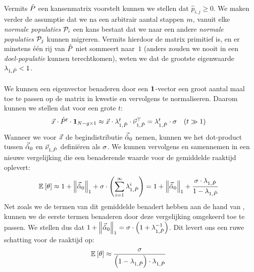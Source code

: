 \paragraph{}
Vermits $\removmat$ een kansenmatrix voorstelt kunnen we stellen dat $\hat{p}_{i,j}\geq 0$. We maken verder de assumptie dat we na een arbitrair aantal stappen $\arbitraryval$, vanuit elke \emph{normale populaties} $\calP_i$ een kans bestaat dat we naar een andere \emph{normale populaties} $\calP_j$ kunnen migreren. Vermits hierdoor de matrix primitief is, en er minstens \'e\'en rij van $\removmat$ niet sommeert naar~$1$ (anders zouden we nooit in een \emph{doel-populatie} kunnen terechtkomen), weten we dat de grootste eigenwaarde $\ev[1,\removmat]<1$.

\paragraph{}
We kunnen een eigenvector benaderen door een $\onematrix$-vector een groot aantal maal toe te passen op de matrix in kwestie en vervolgens te normaliseren. Daarom kunnen we stellen dat voor een grote $t$:
\begin{equation}
\begin{array}{cc}
\arbitraryvec\cdot\removmat^t\cdot\onematrix[\npop-\ntarpop\times1]\approx\arbitraryvec\cdot\ev[1,\removmat]^t\cdot\evr[1,\removmat]^{\top}=\ev[1,\removmat]^t\cdot\metapa&\mbox{($t\gg 1$)}
\end{array}
\eqnlab{longTermAlpha}
\end{equation}
Wanneer we voor $\arbitraryvec$ de begindistributie $\probdistnormmeta{0}$ nemen, kunnen we het dot-product tussen $\probdistnormmeta{0}$ en $\evr[1,\removmat]$ defini\"eren als $\metapa$. We kunnen vervolgens  en  samennemen in een nieuwe vergelijking die een benaderende waarde voor de gemiddelde raaktijd oplevert:
\begin{equation}
\mean{\hittime}\approx 1+\dabs[1]{\probdistnormmeta{0}}+\metapa\cdot\brak{\displaystyle\sum_{i=1}^{\infty}\ev[1,\removmat]^i}=1+\dabs[1]{\probdistnormmeta{0}}+\displaystyle\frac{\metapa\cdot \ev[1,\removmat]}{1-\ev[1,\removmat]}
\end{equation}
Net zoals we de termen van dit gemiddelde benadert hebben aan de hand van , kunnen we de eerste termen benaderen door deze vergelijking omgekeerd toe te passen. We stellen dus dat $1+\dabs[1]{\probdistnormmeta{0}}=\metapa\cdot\brak{1+\ev[1,\removmat]^{-1}}$. Dit levert ons een ruwe schatting voor de raaktijd op:
\begin{equation}
\mean{\hittime}\approx\displaystyle\frac{\metapa}{\brak{1-\ev[1,\removmat]}\cdot\ev[1,\removmat]}
\eqnlab{hitTimeSingle}
\end{equation}


